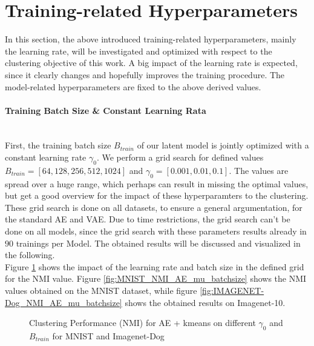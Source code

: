\documentclass[12pt,DIV14,BCOR12mm,a4paper,footexclude,headinclude,halfparskip-,twoside,openright,cleardoubleempty,idxtotoc,bibtotoc,listtotoc]{scrreprt} %
\numberwithin{equation}{chapter}
\begin{document}
\section{Training-related Hyperparameters}
In this section, the above introduced training-related hyperparameters, mainly the learning rate, will be investigated and optimized with respect to the clustering objective of this work. A big impact of the learning rate is expected, since it clearly changes and hopefully improves the training procedure. The model-related hyperparameters are fixed to the above derived values.
\paragraph{Training Batch Size \& Constant Learning Rata}\hfill \\
First, the training batch size $B_{train}$ of our latent model is jointly optimized with a constant learning rate $\gamma_0$. We perform a grid search for defined values $B_{train} = [64, 128, 256, 512, 1024]$ and $\gamma_0 = [0.001, 0.01, 0.1]$. The values are spread over a huge range, which perhaps can result in missing the optimal values, but get a good overview for the impact of these hyperparamters to the clustering. These grid search is done on all datasets, to ensure a general argumentation, for the standard AE and VAE. Due to time restrictions, the grid search can't be done on all models, since the grid search with these parameters results already in $90$ trainings per Model. The obtained results will be discussed and visualized in the following.\\
Figure \ref{fig:ClusterPerformance_AE_LearningRate_BatchSize} shows the impact of the learning rate and batch size in the defined grid for the NMI value. Figure \ref{fig:MNIST_NMI_AE_mu_batchsize} shows the NMI values obtained on the MNIST dataset, while figure \ref{fig:IMAGENET-Dog_NMI_AE_mu_batchsize} shows the obtained results on Imagenet-10.
	 \begin{figure}[htb!]
		\centering
		\qquad
		\caption{Clustering Performance (NMI) for AE + kmeans on different $\gamma_0$ and $B_{train}$ for MNIST and Imagenet-Dog}
		\label{fig:ClusterPerformance_AE_LearningRate_BatchSize}
	\end{figure}
\end{document}
